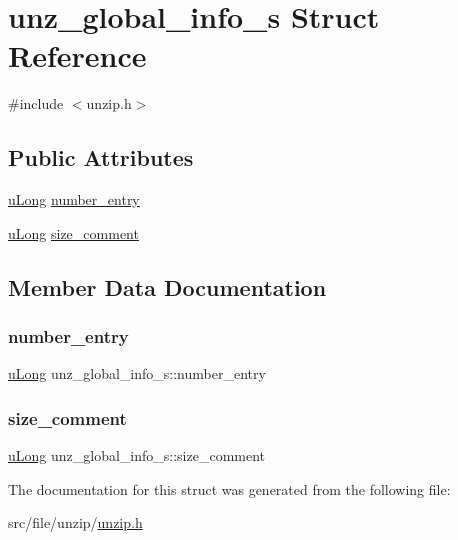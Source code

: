 \hypertarget{structunz__global__info__s}{}\section{unz\+\_\+global\+\_\+info\+\_\+s Struct Reference}
\label{structunz__global__info__s}


{\ttfamily \#include $<$unzip.\+h$>$}

\subsection*{Public Attributes}
\begin{DoxyCompactItemize}
\item 
\hyperlink{ioapi_8h_a50e9e9d5c30e481de822ad68fe537986}{u\+Long} \hyperlink{structunz__global__info__s_a827d1cd1d09f12acd6c2ee12494cb320}{number\+\_\+entry}
\item 
\hyperlink{ioapi_8h_a50e9e9d5c30e481de822ad68fe537986}{u\+Long} \hyperlink{structunz__global__info__s_a10b58ab57b62301de813ecac0e974363}{size\+\_\+comment}
\end{DoxyCompactItemize}


\subsection{Member Data Documentation}
\mbox{\label{structunz__global__info__s_a827d1cd1d09f12acd6c2ee12494cb320}} 
\subsubsection{\texorpdfstring{number\+\_\+entry}{number\_entry}}
{\footnotesize\ttfamily \hyperlink{ioapi_8h_a50e9e9d5c30e481de822ad68fe537986}{u\+Long} unz\+\_\+global\+\_\+info\+\_\+s\+::number\+\_\+entry}

\mbox{\label{structunz__global__info__s_a10b58ab57b62301de813ecac0e974363}} 
\subsubsection{\texorpdfstring{size\+\_\+comment}{size\_comment}}
{\footnotesize\ttfamily \hyperlink{ioapi_8h_a50e9e9d5c30e481de822ad68fe537986}{u\+Long} unz\+\_\+global\+\_\+info\+\_\+s\+::size\+\_\+comment}



The documentation for this struct was generated from the following file\+:\begin{DoxyCompactItemize}
\item 
src/file/unzip/\hyperlink{unzip_8h}{unzip.\+h}\end{DoxyCompactItemize}
